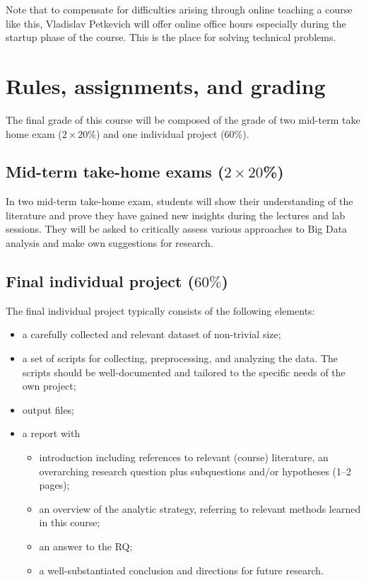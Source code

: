 \documentclass[a4paper,10pt,twocolumn]{report}
\newenvironment{corona}{%
	\begin{shaded*}%
	}{%
	\end{shaded*}%
}
\begin{document}
\begin{corona}Note that to compensate for difficulties arising through online teaching a course like this, Vladislav Petkevich will offer online office hours especially during the startup phase of the course. This is the place for solving technical problems.
\end{corona}


\chapter{Rules, assignments, and grading}
The final grade of this course will be composed of the grade of two mid-term take home exam ($2 \times 20$\%) and one individual project (60\%).

\section{Mid-term take-home exams ($2 \times 20$\%)}
In two mid-term take-home exam, students will show their understanding of the literature and prove they have gained new insights during the lectures and lab sessions. They will be asked to critically assess various approaches to Big Data analysis and make own suggestions for research.

\section{Final individual project ($60\%$)}
The final individual project typically consists of the following elements:
\begin{itemize}
\item a carefully collected and relevant dataset of non-trivial size;
\item a set of scripts for collecting, preprocessing, and analyzing the data. The scripts should be well-documented and tailored to the specific needs of the own project;
\item output files;
\item a report with
\begin{itemize}
	\item introduction including references to relevant (course) literature, an overarching research question plus subquestions and/or hypotheses (1--2 pages);
	\item an overview of the analytic strategy, referring to relevant methods learned in this course;
	\item an answer to the RQ;
	\item a well-substantiated conclusion and directions for future research.
\end{itemize}
\end{itemize}
\end{document}
